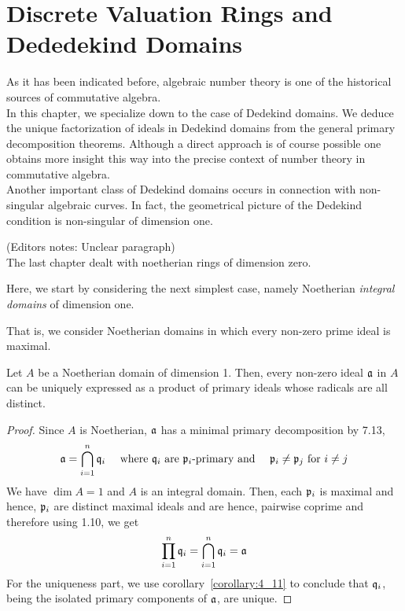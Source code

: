 \chapter{Discrete Valuation Rings and Dededekind Domains}
\label{ch:dvr_dd}

As it has been indicated before, algebraic number theory is one of the
historical sources of commutative algebra. \\

In this chapter, we specialize down to the case of Dedekind domains.
We deduce the unique factorization of ideals in Dedekind domains from
the general primary decomposition theorems.
Although a direct approach is of course possible one obtains more insight
this way into the precise context of number theory in commutative algebra. \\

Another important class of Dedekind domains occurs in connection with
non-singular algebraic curves.
In fact, the geometrical picture of the Dedekind condition is
non-singular of dimension one.

(Editors notes: Unclear paragraph) \\

The last chapter dealt with noetherian rings of dimension zero.

Here, we start by considering the next simplest case, namely Noetherian
\textit{integral domains} of dimension one.

That is, we consider Noetherian domains in which every non-zero prime
ideal is maximal.

\begin{proposition}{}{}
\label{prop:9.1}
	Let \(A\) be a Noetherian domain of dimension 1.
	Then, every non-zero ideal \(\mathfrak{a}\) in \(A\) can be uniquely
	expressed as a product of primary ideals whose radicals are
	all distinct.
\end{proposition}
\begin{proof}
	Since \(A\) is Noetherian, \(\mathfrak{a}\) has a minimal primary
	decomposition by 7.13,
	\[
		\mathfrak{a} = \bigcap_{i=1}^n \mathfrak{q}_i \quad
		\text{ where } \mathfrak{q}_i \text{ are } \mathfrak{p}_i\text{-primary and }
		\quad \mathfrak{p}_i \neq \mathfrak{p}_j \text{ for } i \neq j
	\]
	We have \(\dim A = 1\) and \(A\) is an integral domain.
	Then, each \(\mathfrak{p}_i\) is maximal and hence, \(\mathfrak{p}_i\) are distinct
	maximal ideals and are hence, pairwise coprime and therefore using
	1.10, we get
	\[
		\prod_{i=1}^n{\mathfrak{q}_i} = \bigcap_{i=1}^n \mathfrak{q}_i = \mathfrak{a}
	\]
	For the uniqueness part, we use corollary~\ref{corollary:4_11} to
	conclude that \(\mathfrak{q}_i\), being the isolated primary components
	of \(\mathfrak{a}\), are unique.
\end{proof}


